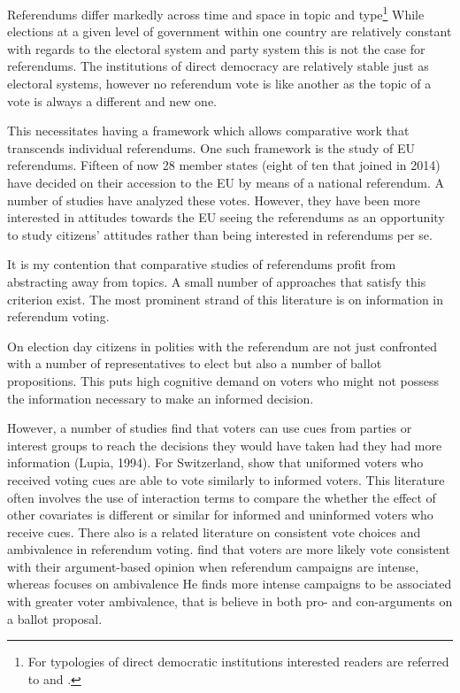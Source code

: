 \documentclass[11pt,a4paper]{article}\usepackage[]{graphicx}\usepackage[]{color}
\begin{document}
    Referendums differ markedly across time and space in topic and type\footnote{For typologies of direct democratic institutions interested readers are referred to \citep{altman_direct_2010} and \citep{hug_occurrence_2004}.} While elections at a given level of government within one country are relatively constant with regards to the electoral system and party system this is not the case for referendums. The institutions of direct democracy are relatively stable just as electoral systems, however no referendum vote is like another as the topic  of a vote is always a different and new one.
    
    This necessitates having a framework which allows comparative work that transcends individual referendums. One such framework is the study of EU referendums. Fifteen of now 28 member states (eight of ten that joined in 2014) have decided on their accession to the EU by means of a national referendum. A number of studies have analyzed these votes. However, they have been more interested in attitudes towards the EU seeing the referendums as an opportunity to study citizens' attitudes rather than being interested in referendums per se.
    
    It is my contention that comparative studies of referendums profit from abstracting away from topics. A small number of approaches that satisfy this criterion exist. The most prominent strand of this literature is on information in referendum voting.
    
    On election day citizens in polities with the referendum are not just confronted with a number of representatives to elect but also a number of ballot propositions. This puts high cognitive demand on voters who might not possess the information necessary to make an informed decision. 
    
    However, a number of studies find that voters can use cues from parties or interest groups to reach the decisions they would have taken had they had more information (Lupia, 1994). For Switzerland, \citet{christin_interests_2002} show that uniformed voters who received voting cues are able to vote similarly to informed voters. This literature often involves the use of interaction terms to compare the whether the effect of other covariates is different or similar for informed and uninformed voters who receive cues. 
    There also is a related literature on consistent vote choices and ambivalence in referendum voting. \citet{lanz_vote_2014} find that voters are more likely vote consistent with their argument-based opinion when referendum campaigns are intense, whereas  \citet{nai_cadillac_2014} focuses on ambivalence He finds more intense campaigns to be associated with greater voter ambivalence, that is believe in both pro- and con-arguments on a ballot proposal.
    
\end{document}
